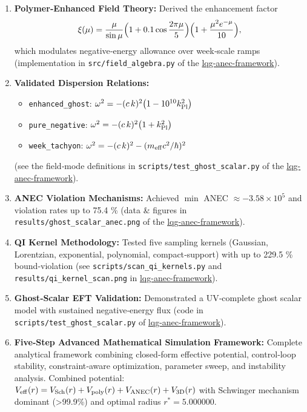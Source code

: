 \documentclass[11pt]{article}
\begin{document}
\begin{enumerate}[label=\arabic*.]
\item \textbf{Polymer‐Enhanced Field Theory:}  
  Derived the enhancement factor  
  \[
    \xi(\mu)
    = \frac{\mu}{\sin\mu}
      \Bigl(1 + 0.1\cos\frac{2\pi\mu}{5}\Bigr)
      \Bigl(1 + \frac{\mu^2 e^{-\mu}}{10}\Bigr),
  \]
  which modulates negative‐energy allowance over week‐scale ramps  
  (implementation in \texttt{src/field_algebra.py} of the
  \href{https://github.com/arcticoder/lqg-anec-framework}{lqg-anec-framework}).  

  \item \textbf{Validated Dispersion Relations:}
    \begin{itemize}[nosep]
      \item \texttt{enhanced\_ghost}: \(\omega^2 = -(c\,k)^2\bigl(1 - 10^{10}k_{\rm Pl}^2\bigr)\)  
      \item \texttt{pure\_negative}: \(\omega^2 = -(c\,k)^2\bigl(1 + k_{\rm Pl}^2\bigr)\)  
      \item \texttt{week\_tachyon}: \(\omega^2 = -(c\,k)^2 - (m_{\rm eff}c^2/\hbar)^2\)  
    \end{itemize}
    (see the field‐mode definitions in
    \texttt{scripts/test\_ghost\_scalar.py} of the
    \href{https://github.com/arcticoder/lqg-anec-framework}{lqg-anec-framework}).  

  \item \textbf{ANEC Violation Mechanisms:}
    Achieved \(\min\) ANEC \(\approx -3.58\times10^5\) and violation rates up to 75.4 \%  
    (data \& figures in \texttt{results/ghost\_scalar\_anec.png} of the
    \href{https://github.com/arcticoder/lqg-anec-framework}{lqg-anec-framework}).  

  \item \textbf{QI Kernel Methodology:}
    Tested five sampling kernels (Gaussian, Lorentzian, exponential,
    polynomial, compact‐support) with up to 229.5 \% bound‐violation  
    (see \texttt{scripts/scan\_qi\_kernels.py} and
    \texttt{results/qi\_kernel\_scan.png} in
    \href{https://github.com/arcticoder/lqg-anec-framework}{lqg-anec-framework}).  
  \item \textbf{Ghost‐Scalar EFT Validation:}
    Demonstrated a UV‐complete ghost scalar model with sustained negative‐energy flux  
    (code in \texttt{scripts/test\_ghost\_scalar.py} of
    \href{https://github.com/arcticoder/lqg-anec-framework}{lqg-anec-framework}).

  \item \textbf{Five‐Step Advanced Mathematical Simulation Framework:}
    Complete analytical framework combining closed‐form effective potential, control‐loop 
    stability, constraint‐aware optimization, parameter sweep, and instability analysis.
    Combined potential: $V_{\rm eff}(r) = V_{\rm Sch}(r) + V_{\rm poly}(r) + V_{\rm ANEC}(r) + V_{\rm 3D}(r)$
    with Schwinger mechanism dominant (>99.9\%) and optimal radius $r^* = 5.000000$.


\end{enumerate}
\end{document}
